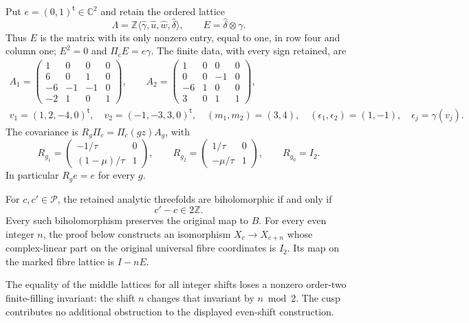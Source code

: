 Put $e=(0,1)^{\mathsf t}\in\mathbb C^2$ and retain the ordered lattice
\[
 \Lambda=\mathbb Z\langle\widehat\gamma,\widehat u,
                        \widehat w,\widehat\delta\rangle,
 \qquad E=\widehat\delta\otimes\gamma.
 \tag{PS2}\label{pshift:eq:rank-one-map}
\]
Thus $E$ is the matrix with its only nonzero entry, equal to one, in
row four and column one; $E^2=0$ and $\Pi_cE=e\gamma$.
The finite data, with every sign retained, are
\[
\begin{gathered}
 A_1=\begin{pmatrix}1&0&0&0\\6&0&1&0\\-6&-1&-1&0\\-2&1&0&1\end{pmatrix},
 \qquad
 A_2=\begin{pmatrix}1&0&0&0\\0&0&-1&0\\-6&1&0&0\\3&0&1&1\end{pmatrix},\\
 v_1=(1,2,-4,0)^{\mathsf t},\quad
 v_2=(-1,-3,3,0)^{\mathsf t},\quad
 (m_1,m_2)=(3,4),\quad
 (\epsilon_1,\epsilon_2)=(1,-1),\quad \epsilon_j=\gamma(v_j).
\end{gathered}
\tag{PS3}\label{pshift:eq:finite-data}
\]
The covariance is $R_g\Pi_c=\Pi_c(gz)A_g$, with
\[
 R_{g_1}=\begin{pmatrix}-1/\tau&0\\(1-\mu)/\tau&1\end{pmatrix},\qquad
 R_{g_2}=\begin{pmatrix}1/\tau&0\\-\mu/\tau&1\end{pmatrix},\qquad
 R_{g_0}=I_2.
 \tag{PS4}\label{pshift:eq:covariance}
\]
In particular $R_ge=e$ for every $g$.

\begin{cited}\label{pshift:thm:classification}
For $c,c'\in\mathcal P$, the retained analytic threefolds are
biholomorphic if and only if
\[
                         c'-c\in2\mathbb Z.
 \tag{PS5}\label{pshift:eq:classification}
\]
Every such biholomorphism preserves the original map to $B$. For every
even integer $n$, the proof below constructs an isomorphism
$X_c\longrightarrow X_{c+n}$ whose complex-linear part on the original
universal fibre coordinates is $I_2$. Its map on the marked fibre lattice
is $I-nE$.

The equality of the middle lattices for all integer shifts loses a
nonzero order-two finite-filling invariant: the shift $n$ changes that
invariant by $n\bmod2$. The cusp contributes no additional obstruction
to the displayed even-shift construction.
\end{cited}


